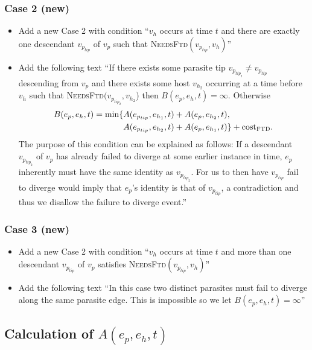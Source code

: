 \documentclass{article}
\begin{document}
\subsubsection{Case 2 (new)}
\begin{itemize}
\item Add a new Case 2 with condition ``$v_{h}$ occurs at time $t$ and there are exactly one descendant $v_{p_{tip}}$ of $v_{p}$ such that \textsc{NeedsFtd}$(v_{p_{tip}}, v_{h})$''
\item Add the following text ``If there exists some parasite tip $v_{p_{tip_{2}}} \neq v_{p_{tip}}$ descending from $v_{p}$ and there exists some host $v_{h_{2}}$ occurring at a time before $v_{h}$ such that  \textsc{NeedsFtd}$(v_{p_{tip_{2}}}, v_{h_{2}}$) then $B(e_{p}, e_{h}, t) = \infty$. Otherwise 
\begin{align*}
B(e_{p}, e_{h}, t) = \min\{&A(e_{p_{tip}}, e_{h_{1}}, t) + A(e_{p}, e_{h_{2}}, t),\\
&A(e_{p_{tip}}, e_{h_{2}}, t) + A(e_{p}, e_{h_{1}}, t)\} + \text{cost}_{\textsc{FTD}}.
\end{align*}
The purpose of this condition can be explained as follows: If a descendant $v_{p_{tip_{2}}}$ of $v_{p}$ has already failed to diverge at some earlier instance in time, $e_{p}$ inherently must have the same identity as $v_{p_{tip_{2}}}$. For us to then have $v_{p_{tip}}$ fail to diverge would imply that $e_{p}$'s identity is that of $v_{p_{tip}}$, a contradiction and thus we disallow the failure to diverge event.''
\end{itemize}

\subsubsection{Case 3 (new)}
\begin{itemize}
\item Add a new Case 2 with condition ``$v_{h}$ occurs at time $t$ and more than one descendant $v_{p_{tip}}$ of $v_{p}$ satisfies \textsc{NeedsFtd}$(v_{p_{tip}}, v_{h})$''
\item Add the following text ``In this case two distinct parasites must fail to diverge along the same parasite edge. This is impossible so we let $B(e_{p}, e_{h}, t) = \infty$''
\end{itemize}

\subsection{Calculation of $A(e_{p}, e_{h}, t)$}
\end{document}
